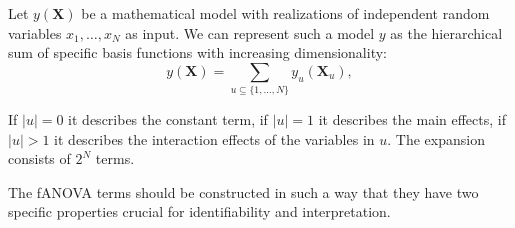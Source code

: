 \begin{definition}
Let $y(\boldsymbol{X})$  be a mathematical model with realizations of independent random variables $x_1, \dots, x_N$ as input. We can represent such a model $y$ as the hierarchical sum of specific basis functions with increasing dimensionality:
\begin{equation}
    y(\boldsymbol{X}) = \sum_{u \subseteq \{1, \dots, N\}} y_{u}(\boldsymbol{X}_u),
    \label{eq:fanova_decomposition}
\end{equation}
\end{definition}

If $|u| = 0$ it describes the constant term, if $|u| = 1$ it describes the main effects, if $|u| > 1$ it describes the interaction effects of the variables in $u$. The expansion consists of $2^N$ terms.\par


The fANOVA terms should be constructed in such a way that they have two specific properties crucial for identifiability and interpretation.

